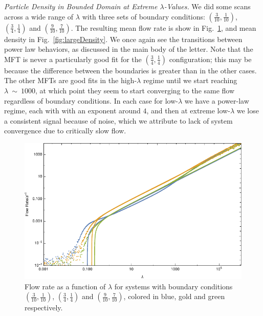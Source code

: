 \documentclass[
reprint,
 amsmath,amssymb,
 aps,
 prl,
]{revtex4-1}
\begin{document}
\textit{Particle Density in Bounded Domain at Extreme $\lambda$-Values.}
We did some scans across a wide range of $\lambda$ with three sets of boundary conditions: $(\frac{3}{10}, \frac{1}{10})$, $(\frac{3}{4}, \frac{1}{4})$ and $(\frac{9}{10}, \frac{7}{10})$. The resulting mean flow rate is show in
Fig.~\ref{fig:largeFlow}, and mean density in Fig.~\ref{fig:largeDensity}. We once again see the transitions between power law behaviors, as discussed in the main body of the letter. Note that the MFT is never a particularly good
fit for the $(\frac{3}{4}, \frac{1}{4})$ configuration; this may be because the difference between the boundaries is greater than in the other cases. The other MFTs are good fits in the high-$\lambda$ regime until we start reaching $\lambda~\sim~1000$,
at which point they seem to start converging to the same flow regardless of boundary conditions. In each case for low-$\lambda$ we have a power-law regime, each with with an exponent around $4$, and then at extreme low-$\lambda$ we lose
a consistent signal because of noise, which we attribute to lack of system convergence due to critically slow flow.
\begin{figure}[h!]
\vspace{1em}
\caption{\label{fig:largeFlow} Flow rate as a function of $\lambda$ for systems with boundary conditions $(\frac{3}{10}, \frac{1}{10})$, $(\frac{3}{4}, \frac{1}{4})$ and $(\frac{9}{10}, \frac{7}{10})$, colored in blue, gold and green
respectively.}
    \includegraphics[width=0.95\linewidth]{images/largeRangeFlow}
    \vspace{0em}
\end{figure}
\end{document}
